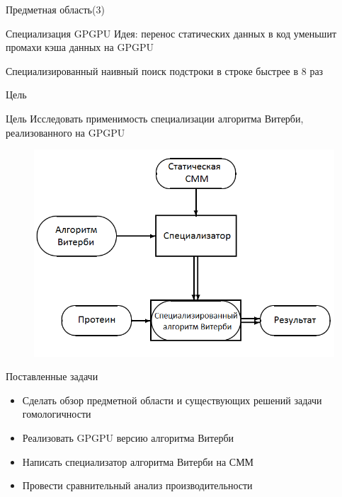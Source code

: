 \documentclass[hyperref={pdfpagelabels=false}]{beamer}
\begin{document}
\begin{frame}{Предметная область(3)}
\begin{block}{Специализация GPGPU}
	Идея: перенос статических данных в код уменьшит промахи кэша данных на 
	GPGPU
\end{block}
\vfill
Специализированный наивный поиск подстроки в строке быстрее в 8 раз
\end{frame} 

\begin{frame}{Цель}
\begin{block}{Цель}
Исследовать применимость специализации алгоритма Витерби, реализованного на 
GPGPU
\end{block}
\vfill
\begin{figure}
	\includegraphics[scale=0.40]{spec_Viterbi.png}
\end{figure}
\end{frame}


\begin{frame}{Поставленные задачи}
\begin{itemize}
	\item Сделать обзор предметной области и существующих решений задачи 
		гомологичности
	\vfill
	\item Реализовать GPGPU версию алгоритма Витерби
	\vfill
	\item Написать специализатор алгоритма Витерби на СММ
	\vfill
	\item Провести сравнительный анализ производительности
\end{itemize}
\end{frame}
\end{document}
